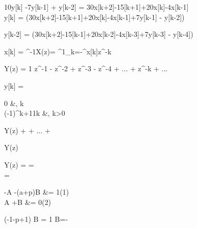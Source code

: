 \begin{abox}
	10y[k] -7y[k-1] + y[k-2] = 30x[k+2]-15[k+1]+20x[k]-4x[k-1]\\
	y[k] = \left(30x[k+2]-15[k+1]+20x[k]-4x[k-1]+7y[k-1] - y[k-2]\right)
\end{abox}

\begin{abox}
	y[k-2] = \left(30x[k+2]-15[k-1]+20x[k-2]-4x[k-3]+7y[k-3] - y[k-4]\right)
\end{abox}

\begin{abox}
	x[k] = ^{-1}\left\lbrace X(z)\right\rbrace  = ^1\left\lbrace \sum_{k=-\infty}^{\infty}x[k]z^{-k}\right\rbrace
\end{abox}

\begin{abox}
	Y(z) = 1 \cdot z^{-1} -  z^{-2} +  z^{-3} -  z^{-4} + ... + z^{-k} + ...
\end{abox}

\begin{abox}
	y[k] = \begin{cases}
		0 &, k \\ (-1)^{k+1}\cdot\frac1k &, k>0
	\end{cases}
\end{abox}

\begin{abox}
	Y(z) \overset{!}{=}  +  + ... + 
\end{abox}


\begin{abox}
	Y(z) \overset{!}{=} 
\end{abox}

\begin{abox}
	Y(z) =  = \\ = 
\end{abox}

\begin{abox}
	-A -(a+p)B &= 1\quad (1)\\
	A  +B	&= 0\quad (2)
\end{abox}

\begin{abox}
	(-1-p+1) \cdot B = 1  B=-
\end{abox}

